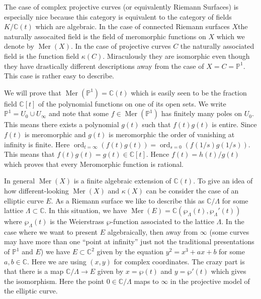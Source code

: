 \documentclass[12pt]{book}
\numberwithin{equation}{section}
\theoremstyle{definition}
\theoremstyle{remark}
\newcommand{\CC}{\mathbb{C}}
\newcommand{\PP}{\mathbb{P}}
\newcommand{\Mer}{\operatorname{Mer}}
\newcommand{\ord}{\operatorname{ord}}
\begin{document}
The case of complex projective curves (or equivalently Riemann Surfaces) is especially nice because this category is equivalent to the category of fields $K/\CC(t)$ which are algebraic. 
In the case of connected Riemann surfaces $X$the naturally assocaited field is the field of meromorphic functions on $X$ which we denote by $\Mer(X)$. 
In the case of projective curves $C$ the naturally associated field is the function field $\kappa(C)$.
Miraculously they are isomorphic even though they have drastically different descriptions away from the case of $X=C=\PP^1$. 
This case is rather easy to describe. 

We will prove that $\Mer(\PP^1) = \CC(t)$ which is easily seen to be the fraction field $\CC[t]$ of the polynomial functions on one of its open sets. 
We write $\PP^1 = U_0 \cup U_{\infty}$ and note that some $f \in \Mer(\PP^1)$ has finitely many poles on $U_0$. 
This means there exists a polynomial $g(t)$ such that $f(t)g(t)$ is entire. 
Since $f(t)$ is meromorphic and $g(t)$ is meromorphic the order of vanishing at infinity is finite. 
Here $\ord_{t=\infty} ( f(t) g(t)) = \ord_{s=0}(f(1/s)g(1/s) )$. 
This means that $f(t)g(t) = g(t) \in \CC[t]$. 
Hence $f(t) = h(t)/g(t)$ which proves that every Meromorphic function is rational.

In general $\Mer(X)$ is a finite algebraic extension of $\CC(t)$. 
To give an idea of how different-looking $\Mer(X)$ and $\kappa(X)$ can be consider the case of an elliptic curve $E$. 
As a Riemann surface we like to describe this as $\CC/\Lambda$ for some lattice $\Lambda \subset \CC$. 
In this situation, we have $\Mer(E) = \CC(\wp_{\Lambda}(t), \wp_{\Lambda}'(t))$ where $\wp_{\Lambda}(t)$ is the Weierstrass $\wp$-function associated to the lattice $\Lambda$. 
In the case where we want to present $E$ algebraically, then away from $\infty$ (some curves may have more than one ``point at infinity'' just not the traditional presentations of $\PP^1$ and $E$) we have $E \subset \CC^2$ given by the equation $y^2 = x^3+ax+b$ for some $a,b\in \CC$. 
Here we are using $(x,y)$ for complex coordinates. 
The crazy part is that there is a map $\CC/\Lambda \to E$ given by $x = \wp(t)$ and $y=\wp'(t)$ which gives the isomorphism. 
Here the point $0 \in \CC/\Lambda$ maps to $\infty$ in the projective model of the elliptic curve. 
\end{document}
